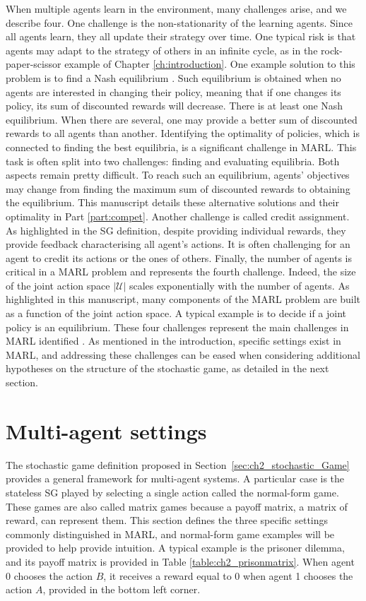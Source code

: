 When multiple agents learn in the environment, many challenges arise, and we describe four.
One challenge is the non-stationarity of the learning agents.
Since all agents learn, they all update their strategy over time.
One typical risk is that agents may adapt to the strategy of others in an infinite cycle, as in the rock-paper-scissor example of Chapter \ref{ch:introduction}.
One example solution to this problem is to find a Nash equilibrium \citep{nash1950equilibrium}.
Such equilibrium is obtained when no agents are interested in changing their policy, meaning that if one changes its policy, its sum of discounted rewards will decrease.
There is at least one Nash equilibrium.
When there are several, one may provide a better sum of discounted rewards to all agents than another.
Identifying the optimality of policies, which is connected to finding the best equilibria, is a significant challenge in MARL.
This task is often split into two challenges: finding and evaluating equilibria.
Both aspects remain pretty difficult.
To reach such an equilibrium, agents' objectives may change from finding the maximum sum of discounted rewards to obtaining the equilibrium.
This manuscript details these alternative solutions and their optimality in Part \ref{part:compet}.
Another challenge is called credit assignment.
As highlighted in the SG definition, despite providing individual rewards, they provide feedback characterising all agent's actions.
It is often challenging for an agent to credit its actions or the ones of others.
Finally, the number of agents is critical in a MARL problem and represents the fourth challenge.
Indeed, the size of the joint action space $|\mathcal{U}|$ scales exponentially with the number of agents.
As highlighted in this manuscript, many components of the MARL problem are built as a function of the joint action space.
A typical example is to decide if a joint policy is an equilibrium.
These four challenges represent the main challenges in MARL identified \cite{marl-book}.
As mentioned in the introduction, specific settings exist in MARL, and addressing these challenges can be eased when considering additional hypotheses on the structure of the stochastic game, as detailed in the next section.

\section{Multi-agent settings} 
\label{sec:ch2_multi_agent_settings}
The stochastic game definition proposed in Section~\ref{sec:ch2_stochastic_Game} provides a general framework for multi-agent systems.
A particular case is the stateless SG played by selecting a single action called the normal-form game.
These games are also called matrix games because a payoff matrix, a matrix of reward, can represent them.
This section defines the three specific settings commonly distinguished in MARL, and normal-form game examples will be provided to help provide intuition.
A typical example is the prisoner dilemma, and its payoff matrix is provided in Table \ref{table:ch2_prisonmatrix}.
When agent 0 chooses the action $B$, it receives a reward equal to 0 when agent 1 chooses the action $A$, provided in the bottom left corner.

